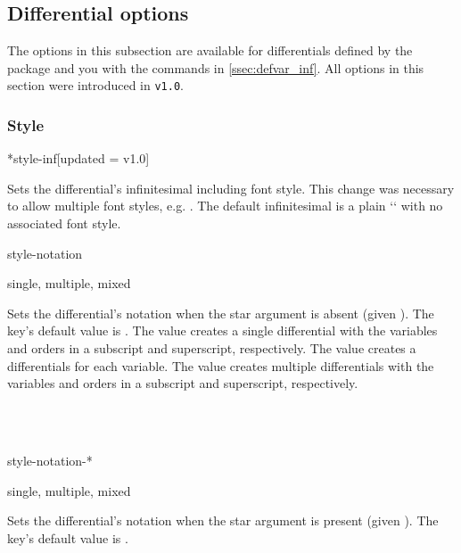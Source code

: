 	\subsection{Differential options} \label{ssec:options_inf}
	The options in this subsection are available for differentials defined by the package and you with the commands in \cref{ssec:defvar_inf}. All options in this section were introduced in \texttt{v1.0}.
	
	\subsubsection*{Style}
	
	\begin{option}*{style-inf}[updated = v1.0]
		\begin{values}[default = d]
		\end{values}
		Sets the differential's infinitesimal including font style. This change was necessary to allow multiple font styles, e.g. . The default infinitesimal is a plain `` with no associated font style.
	\end{option}
	
	\begin{option}{style-notation}
		\begin{values}[default = multiple]
			single, multiple, mixed
		\end{values}
		Sets the differential's notation when the star argument is absent (given ). The key's default value is . The value  creates a single differential with the variables and orders in a subscript and superscript, respectively. The value  creates a differentials for each variable. The value  creates multiple differentials with the variables and orders in a subscript and superscript, respectively.
		
		\begin{example}
			 \\
			 \\
		\end{example}
	\end{option}
	
	\begin{option}{style-notation-*}
		\begin{values}[default = single]
			single, multiple, mixed
		\end{values}
		Sets the differential's notation when the star argument is present (given ). The key's default value is .
	\end{option}
	
